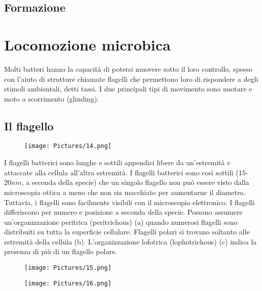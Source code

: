 \subsection{Formazione}




\section{Locomozione microbica}
Molti batteri hanno la capacità di potersi muovere sotto il loro controllo, spesso con l’aiuto di strutture chiamate flagelli che 
permettono loro di rispondere a degli stimoli ambientali, detti tassi. I due principali tipi di movimento sono nuotare e moto a 
scorrimento (glinding). 
\subsection{Il flagello}
\begin{figure}[H]
	\texttt{[image: Pictures/14.png]}
\end{figure}

I flagelli batterici sono lunghe e sottili appendici libere da un'estremità e attaccate alla cellula all'altra estremità. I flagelli batterici sono così 
sottili ($15$-$20 nm$, a seconda della specie) che un singolo flagello non può essere visto dalla microscopia ottica a meno che non sia macchiato per aumentarne 
il diametro. Tuttavia, i flagelli sono facilmente visibili con il microscopio elettronico. I flagelli differiscono per numero e posizione  a seconda della 
specie. Possono assumere un’organizzazione peritrica (peritrichous) (a) quando numerosi flagelli 
sono distribuiti su tutta la superficie cellulare. Flagelli polari si trovano soltanto alle estremità della cellula (b). L’organizzazione lofotrica 
(lophotrichous) (c) indica la presenza di più di un flagello polare. \\
\newpage
\begin{multicols}{2}
\begin{figure}[H]
	\texttt{[image: Pictures/15.png]}
\end{figure}
	
\begin{figure}[H]
	\texttt{[image: Pictures/16.png]}
\end{figure}
\end{multicols}

